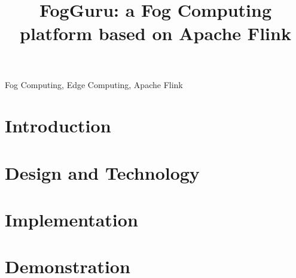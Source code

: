 \documentclass[10pt,conference]{IEEEtran}
\begin{document}
\title{FogGuru: a Fog Computing platform based on Apache Flink\\}

\author{
\and

\and

}

\maketitle

\begin{abstract}

\end{abstract}


\begin{IEEEkeywords}
Fog Computing, Edge Computing, Apache Flink
\end{IEEEkeywords}


\section{Introduction}
\label{sec:introduction}



\section{Design and Technology}
\label{sec:Technology and Design}



\section{Implementation}
\label{sec:implementation}



\section{Demonstration}
\label{sec:demonstration}

\end{document}
